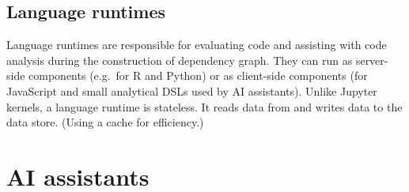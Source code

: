 \documentclass[sigplan,preprint,10pt]{acmart}\settopmatter{printfolios=true,printccs=false,printacmref=false}
\theoremstyle{plain}
\theoremstyle{definition}
\begin{document}
\subsection{Language runtimes}

Language runtimes are responsible for evaluating code and assisting with code analysis during
the construction of dependency graph. They can run as server-side components (e.g.~for R and Python)
or as client-side components (for JavaScript and small analytical DSLs used by AI assistants).
Unlike Jupyter kernels, a language runtime is stateless. It reads data from and writes data to
the data store. (Using a cache for efficiency.)

\section{AI assistants}
\label{sec:ai}
\end{document}
